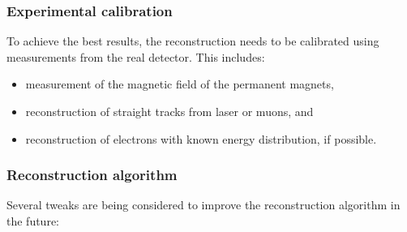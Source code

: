 	\subsubsection*{Experimental calibration}
		To achieve the best results, the reconstruction needs to be calibrated using measurements from the real detector. This includes:
		\begin{itemize}
			\item measurement of the magnetic field of the permanent magnets,
			\item reconstruction of straight tracks from laser or muons, and
			\item reconstruction of electrons with known energy distribution, if possible.
		\end{itemize}
		
	\subsubsection*{Reconstruction algorithm}
		Several tweaks are being considered to improve the reconstruction algorithm in the future:
